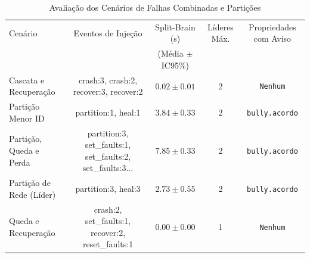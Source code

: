 \begin{table}[htbp]
\caption{Avaliação dos Cenários de Falhas Combinadas e Partições}
\label{tab:cenarios_falha}
\centering
\small
\begin{tabular}{@{}lcccc@{}}
\toprule
Cenário & Eventos de Injeção & Split-Brain (s) & Líderes Máx. & Propriedades com Aviso \\
 & & (Média $\pm$ IC95\%) & & \\
\midrule
Cascata e Recuperação & crash:3, crash:2, recover:3, recover:2 & $0.02 \pm 0.01$ & 2 & \texttt{Nenhum} \\
Partição Menor ID & partition:1, heal:1 & $3.84 \pm 0.33$ & 2 & \texttt{bully.acordo} \\
Partição, Queda e Perda & partition:3, set\_faults:1, set\_faults:2, set\_faults:3... & $7.85 \pm 0.33$ & 2 & \texttt{bully.acordo} \\
Partição de Rede (Líder) & partition:3, heal:3 & $2.73 \pm 0.55$ & 2 & \texttt{bully.acordo} \\
Queda e Recuperação & crash:2, set\_faults:1, recover:2, reset\_faults:1 & $0.00 \pm 0.00$ & 1 & \texttt{Nenhum} \\
\bottomrule
\end{tabular}
\end{table}
